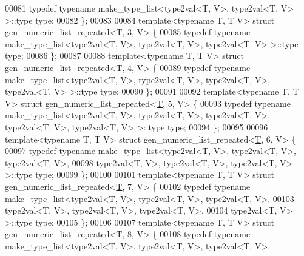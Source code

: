 \begin{DoxyCode}
00081   \textcolor{keyword}{typedef} \textcolor{keyword}{typename} make\_type\_list<type2val<T, V>, type2val<T, V> >::type type;
00082 \};
00083 
00084 \textcolor{keyword}{template}<\textcolor{keyword}{typename} T, T V> \textcolor{keyword}{struct }gen\_numeric\_list\_repeated<\hyperlink{group___sparse_core___module_class_eigen_1_1_triplet}{T}, 3, V> \{
00085   \textcolor{keyword}{typedef} \textcolor{keyword}{typename} make\_type\_list<type2val<T, V>, type2val<T, V>, type2val<T, V> >::type type;
00086 \};
00087 
00088 \textcolor{keyword}{template}<\textcolor{keyword}{typename} T, T V> \textcolor{keyword}{struct }gen\_numeric\_list\_repeated<\hyperlink{group___sparse_core___module_class_eigen_1_1_triplet}{T}, 4, V> \{
00089   \textcolor{keyword}{typedef} \textcolor{keyword}{typename} make\_type\_list<type2val<T, V>, type2val<T, V>, type2val<T, V>, type2val<T, V> >::type 
      type;
00090 \};
00091 
00092 \textcolor{keyword}{template}<\textcolor{keyword}{typename} T, T V> \textcolor{keyword}{struct }gen\_numeric\_list\_repeated<\hyperlink{group___sparse_core___module_class_eigen_1_1_triplet}{T}, 5, V> \{
00093   \textcolor{keyword}{typedef} \textcolor{keyword}{typename} make\_type\_list<type2val<T, V>, type2val<T, V>, type2val<T, V>, type2val<T, V>, 
      type2val<T, V> >::type type;
00094 \};
00095 
00096 \textcolor{keyword}{template}<\textcolor{keyword}{typename} T, T V> \textcolor{keyword}{struct }gen\_numeric\_list\_repeated<\hyperlink{group___sparse_core___module_class_eigen_1_1_triplet}{T}, 6, V> \{
00097   \textcolor{keyword}{typedef} \textcolor{keyword}{typename} make\_type\_list<type2val<T, V>, type2val<T, V>, type2val<T, V>,
00098                                   type2val<T, V>, type2val<T, V>, type2val<T, V> >::type type;
00099 \};
00100 
00101 \textcolor{keyword}{template}<\textcolor{keyword}{typename} T, T V> \textcolor{keyword}{struct }gen\_numeric\_list\_repeated<\hyperlink{group___sparse_core___module_class_eigen_1_1_triplet}{T}, 7, V> \{
00102   \textcolor{keyword}{typedef} \textcolor{keyword}{typename} make\_type\_list<type2val<T, V>, type2val<T, V>, type2val<T, V>,
00103                                   type2val<T, V>, type2val<T, V>, type2val<T, V>,
00104                                   type2val<T, V> >::type type;
00105 \};
00106 
00107 \textcolor{keyword}{template}<\textcolor{keyword}{typename} T, T V> \textcolor{keyword}{struct }gen\_numeric\_list\_repeated<\hyperlink{group___sparse_core___module_class_eigen_1_1_triplet}{T}, 8, V> \{
00108   \textcolor{keyword}{typedef} \textcolor{keyword}{typename} make\_type\_list<type2val<T, V>, type2val<T, V>, type2val<T, V>,

\end{DoxyCode}

